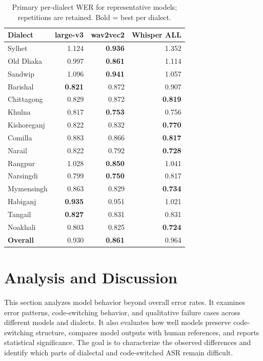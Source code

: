 \documentclass[journal]{IEEEtran}
\newcommand{\best}[1]{\textbf{#1}}
\begin{document}
\begin{table}[t]
\caption{Primary per-dialect WER for representative models; repetitions are
retained. Bold = best per dialect.}
\label{tab:cross}
\centering\scriptsize
\begin{tabular}{@{}lrrr@{}}
\toprule
\textbf{Dialect} & \textbf{large-v3} & \textbf{wav2vec2} & \textbf{Whisper ALL} \\
\midrule
Sylhet & 1.124 & \best{0.936} & 1.352 \\
Old Dhaka & 0.997 & \best{0.861} & 1.114 \\
Sandwip & 1.096 & \best{0.941} & 1.057 \\
Barishal & \best{0.821} & 0.872 & 0.907 \\
Chittagong & 0.829 & 0.872 & \best{0.819} \\
Khulna & 0.817 & \best{0.753} & 0.756 \\
Kishoreganj & 0.822 & 0.832 & \best{0.770} \\
Comilla & 0.883 & 0.866 & \best{0.817} \\
Narail & 0.822 & 0.792 & \best{0.728} \\
Rangpur & 1.028 & \best{0.850} & 1.041 \\
Narsingdi & 0.799 & \best{0.750} & 0.817 \\
Mymensingh & 0.863 & 0.829 & \best{0.734} \\
Habiganj & \best{0.935} & 0.951 & 1.021 \\
Tangail & \best{0.827} & 0.831 & 0.831 \\
Noakhali & 0.803 & 0.825 & \best{0.724} \\
\midrule
\textbf{Overall} & 0.930 & \best{0.861} & 0.964 \\
\bottomrule
\end{tabular}
\end{table}
\section{Analysis and Discussion}
\label{sec:analysis}
This section analyzes model behavior beyond overall error rates. It examines error patterns, code-switching behavior, and qualitative failure cases across different models and dialects. It also evaluates how well models preserve code-switching structure, compares model outputs with human references, and reports statistical significance. The goal is to characterize the observed differences and identify which parts of dialectal and code-switched ASR remain difficult.
\end{document}
